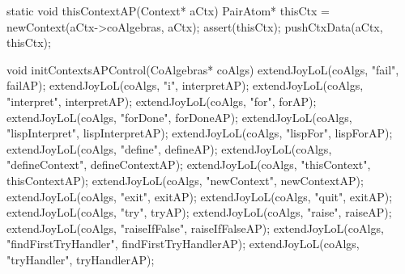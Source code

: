 static void thisContextAP(Context* aCtx) {
  PairAtom* thisCtx = newContext(aCtx->coAlgebras, aCtx);
  assert(thisCtx);
  pushCtxData(aCtx, thisCtx);
}

void initContextsAPControl(CoAlgebras* coAlgs) {
  extendJoyLoL(coAlgs, "fail",                failAP);
  extendJoyLoL(coAlgs, "i",                   interpretAP);
  extendJoyLoL(coAlgs, "interpret",           interpretAP);
  extendJoyLoL(coAlgs, "for",                 forAP);
  extendJoyLoL(coAlgs, "forDone",             forDoneAP);
  extendJoyLoL(coAlgs, "lispInterpret",       lispInterpretAP);
  extendJoyLoL(coAlgs, "lispFor",             lispForAP);
  extendJoyLoL(coAlgs, "define",              defineAP);
  extendJoyLoL(coAlgs, "defineContext",       defineContextAP);
  extendJoyLoL(coAlgs, "thisContext",         thisContextAP);
  extendJoyLoL(coAlgs, "newContext",          newContextAP);
  extendJoyLoL(coAlgs, "exit",                exitAP);
  extendJoyLoL(coAlgs, "quit",                exitAP);
  extendJoyLoL(coAlgs, "try",                 tryAP);
  extendJoyLoL(coAlgs, "raise",               raiseAP);
  extendJoyLoL(coAlgs, "raiseIfFalse",        raiseIfFalseAP);
  extendJoyLoL(coAlgs, "findFirstTryHandler", findFirstTryHandlerAP);
  extendJoyLoL(coAlgs, "tryHandler",          tryHandlerAP);
}